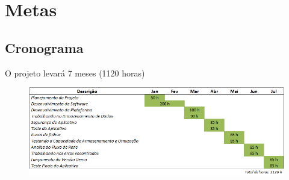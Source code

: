 \chapter[Metas]{Metas}







\section[Cronograma]{Cronograma}




O projeto levará 7 meses (1120 horas)




\begin{figure}[htb]
	\begin{center}
	    \includegraphics[scale=0.8]{diagramaGanttCrono}
	\end{center}
\end{figure}

